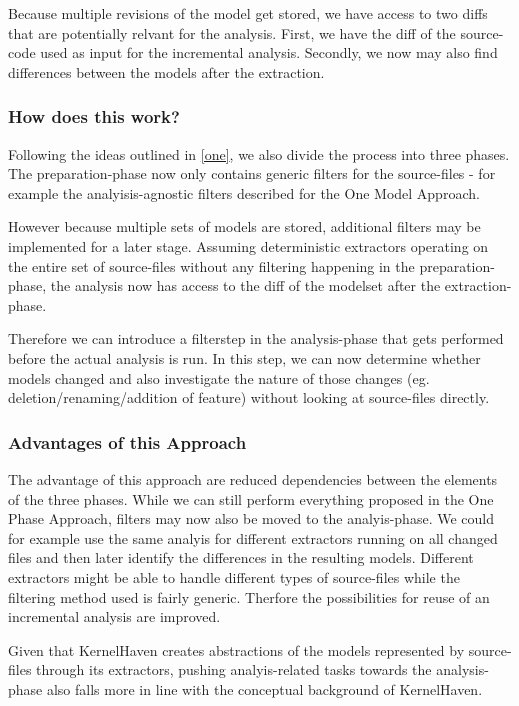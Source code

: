 \documentclass[a4paper]{article}
\begin{document}
Because multiple revisions of the model get stored, we have access to two diffs that are potentially relvant for the analysis. First, we have the diff of the source-code used as input for the incremental analysis. Secondly, we now may also find differences between the models after the extraction.

\subsubsection{How does this work?}

Following the ideas outlined in \autoref{one}, we also divide the process into three phases. The preparation-phase now only contains generic filters for the source-files - for example the analyisis-agnostic filters described for the One Model Approach.

However because multiple sets of models are stored, additional filters may be implemented for a later stage. Assuming deterministic extractors operating on the entire set of source-files without any filtering happening in the preparation-phase, the analysis now has access to the diff of the modelset after the extraction-phase. 

Therefore we can introduce a filterstep in the analysis-phase that gets performed before the actual analysis is run. In this step, we can now determine whether models changed and also investigate the nature of those changes (eg. deletion/renaming/addition of feature) without looking at source-files directly.

\subsubsection{Advantages of this Approach}

The advantage of this approach are reduced dependencies between the elements of the three phases. While we can still perform everything proposed in the One Phase Approach, filters may now also be moved to the analyis-phase. We could for example use the same analyis for different extractors running on all changed files and then later identify the differences in the resulting models. Different extractors might be able to handle different types of source-files while the filtering method used is fairly generic. Therfore the possibilities for reuse of an incremental analysis are improved.

Given that KernelHaven creates abstractions of the models represented by source-files through its extractors, pushing analyis-related tasks towards the analysis-phase also falls more in line with the conceptual background of KernelHaven.
\end{document}
